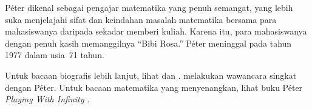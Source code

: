 \documentclass[../../../include/open-logic-section]{subfiles}
\begin{document}
P\'{e}ter dikenal sebagai pengajar matematika yang penuh semangat, yang lebih
suka menjelajahi sifat dan keindahan masalah matematika bersama para
mahasiswanya daripada sekadar memberi kuliah. Karena itu, para mahasiswanya
dengan penuh kasih memanggilnya ``Bibi Rosa.'' P\'eter meninggal pada tahun
1977 dalam usia~71 tahun.

\begin{reading}
Untuk bacaan biografis lebih lanjut, lihat \citep{Oconnor2014} dan
\citep{Andrasfai1986}. \citet{Tamassy1994} melakukan wawancara singkat dengan
P\'eter. Untuk bacaan matematika yang menyenangkan, lihat buku P\'eter
\emph{Playing With Infinity} \citep{Peter2010}.
\end{reading}
\end{document}
